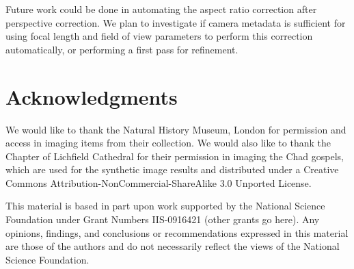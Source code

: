 \documentclass[runningheads,a4paper]{llncs}
\begin{document}
Future work could be done in automating the aspect ratio correction after perspective correction. We plan to
investigate if camera metadata is sufficient for using focal length and field of view parameters to perform this
correction automatically, or performing a first pass for refinement.

\section{Acknowledgments}

We would like to thank the Natural History Museum, London for permission and access in imaging items from their collection. We would also like to thank the Chapter of Lichfield Cathedral for their permission in imaging the Chad gospels,
which are used for the synthetic image results and distributed under a Creative Commons Attribution-NonCommercial-ShareAlike 3.0 Unported License.

This material is based in part upon work supported by the National Science Foundation under Grant Numbers
IIS-0916421 (other grants go here).
Any opinions, findings, and conclusions or recommendations expressed in this material are those of the authors
and do not necessarily reflect the views of the National Science Foundation.



\end{document}
